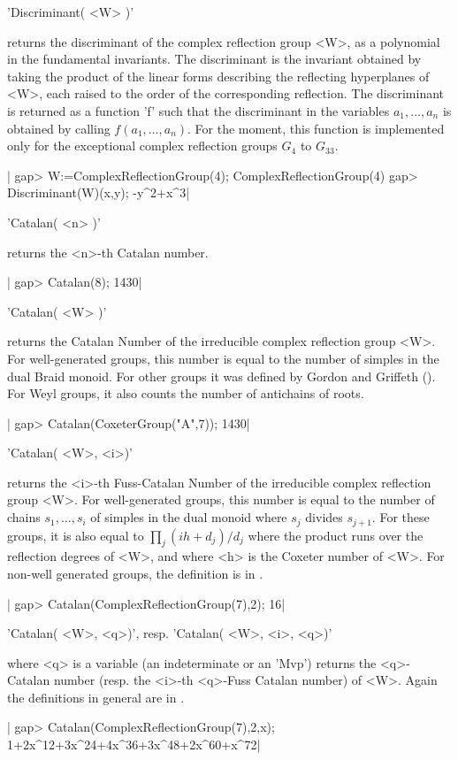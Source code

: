 
'Discriminant( <W> )'

returns  the  discriminant  of  the  complex  reflection  group  <W>,  as a
polynomial in the fundamental invariants. The discriminant is the invariant
obtained  by  taking  the  product  of  the  linear  forms  describing  the
reflecting   hyperplanes  of  <W>,   each  raised  to   the  order  of  the
corresponding reflection. The discriminant is returned as a {\GAP} function
'f'  such  that  the  discriminant  in  the  variables  $a_1,\ldots,a_n$ is
obtained  by calling $f(a_1,\ldots,a_n)$. For  the moment, this function is
implemented  only for  the exceptional  complex reflection  groups $G_4$ to
$G_{33}$.

|    gap> W:=ComplexReflectionGroup(4);
    ComplexReflectionGroup(4)
    gap> Discriminant(W)(x,y);
    -y^2+x^3|


'Catalan( <n> )'

returns  the <n>-th Catalan number.

|    gap> Catalan(8);
    1430|

'Catalan( <W> )'

returns the Catalan Number of the irreducible complex reflection group <W>.
For well-generated groups, this number is equal to the number of simples in
the  dual  Braid  monoid.  For  other  groups  it was defined by Gordon and
Griffeth  (\cite{gg12}).  For  Weyl  groups,  it  also counts the number of
antichains of roots.

|    gap> Catalan(CoxeterGroup("A",7));
    1430|

'Catalan( <W>, <i>)'

returns   the  <i>-th  Fuss-Catalan  Number   of  the  irreducible  complex
reflection  group <W>. For  well-generated groups, this  number is equal to
the  number of chains $s_1,\ldots,s_i$ of  simples in the dual monoid where
$s_j$   divides  $s_{j+1}$.  For   these  groups,  it   is  also  equal  to
$\prod_j(ih+d_j)/d_j$ where the product runs over the reflection degrees of
<W>,  and where <h>  is the Coxeter  number of <W>.  For non-well generated
groups, the definition is in \cite{gg12}.

|    gap> Catalan(ComplexReflectionGroup(7),2);
    16|

'Catalan( <W>, <q>)', resp. 'Catalan( <W>, <i>, <q>)'

where  <q>  is  a  variable  (an  indeterminate  or  an  'Mvp') returns the
<q>-Catalan number (resp. the <i>-th <q>-Fuss Catalan number) of <W>. Again
the definitions in general are in \cite{gg12}.

|    gap> Catalan(ComplexReflectionGroup(7),2,x);
    1+2x^12+3x^24+4x^36+3x^48+2x^60+x^72|

